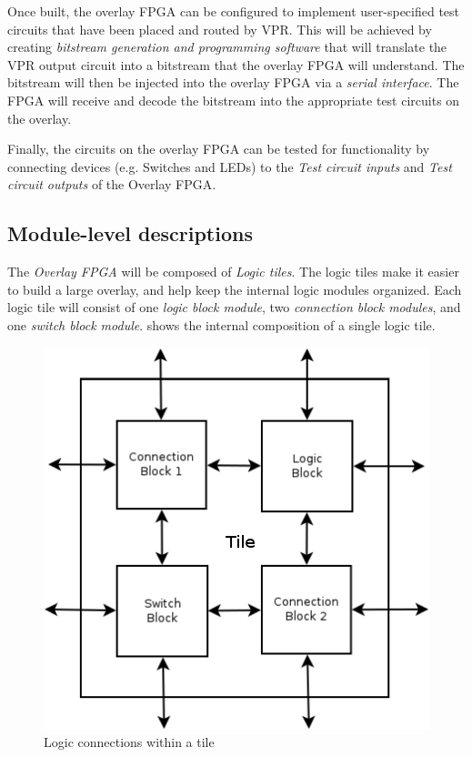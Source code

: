 Once built, the overlay FPGA can be configured to implement user-specified test circuits that have been placed and routed by VPR.
This will be achieved by creating \emph{bitstream generation and programming software} that will translate the VPR output circuit into a bitstream that the overlay FPGA will understand.
The bitstream will then be injected into the overlay FPGA via a \emph{serial interface}.
The FPGA will receive and decode the bitstream into the appropriate test circuits on the overlay.

Finally, the circuits on the overlay FPGA can be tested for functionality by connecting devices (e.g. Switches and LEDs) to the \emph{Test circuit inputs} and \emph{Test circuit outputs} of the Overlay FPGA.


\subsection{Module-level descriptions} %

The \emph{Overlay FPGA} will be composed of \emph{Logic tiles}.
The logic tiles make it easier to build a large overlay, and help keep the internal 
logic modules organized.
Each logic tile will consist of one \emph{logic block module}, two \emph{connection block modules}, 
and one \emph{switch block module}.
 shows the internal composition of a single logic tile.

\begin{figure}[!h]
	\centering
	\includegraphics[scale=0.6]{tile.png}
	\caption{Logic connections within a tile}
	\label{tile-diagram}
\end{figure}

